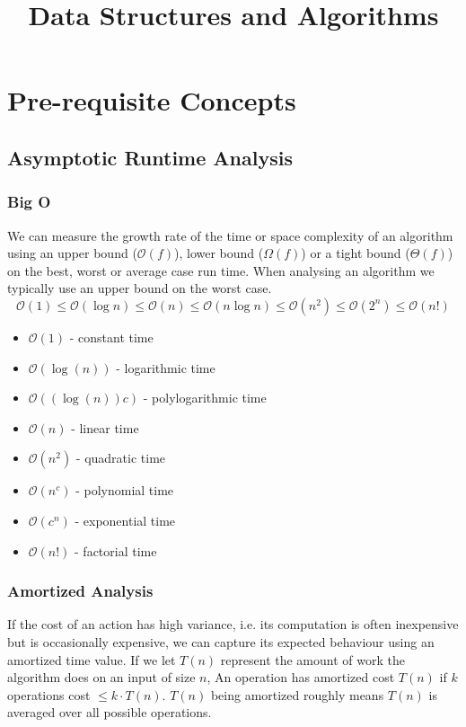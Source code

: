 \documentclass{article}
\title{\vspace{-3cm} Data Structures and Algorithms}
\author{}
\date{}
\newcommand{\bigO}{\mathcal{O}}
\begin{document}
\maketitle
\vspace{-1.5cm}
\tableofcontents
\newpage

\section{Pre-requisite Concepts}

    \subsection{Asymptotic Runtime Analysis}
    \subsubsection{Big O}
    We can measure the growth rate of the time or space complexity of an algorithm using an upper bound ($\bigO(f)$), lower bound ($\Omega (f) $) or a tight bound ($\Theta (f)$) on the best, worst or average case run time. When analysing an algorithm we typically use an upper bound on the worst case. 
    \[
        \bigO(1) \leq \bigO(\log n) \leq \bigO(n) \leq \bigO(n \log n) \leq \bigO(n^2) \leq  \bigO(2^n)  \leq \bigO(n!)
    \]
    \begin{multicols}{2}
    \begin{itemize}
        \item[] $\bigO(1)$ - constant time
        \item[] $\bigO(\log(n))$ - logarithmic time
        \item[] $\bigO((\log(n))c)$ - polylogarithmic time
        \item[] $\bigO(n)$ - linear time
        \item[] $\bigO(n^2)$ - quadratic time
        \item[] $\bigO(n^c)$ - polynomial time
        \item[] $\bigO(c^n)$ - exponential time
        \item[] $\bigO(n!)$ - factorial time
    \end{itemize}
    \end{multicols}
    
    \subsubsection{Amortized Analysis}
    If the cost of an action has high variance, i.e. its computation is often inexpensive but is occasionally expensive, we can capture its expected behaviour using an amortized time value. If we let $T(n)$ represent the amount of work the algorithm does on an input of size $n$, An operation has amortized cost $T(n)$ if $k$ operations cost $\leq k \cdot T(n)$. $T(n)$ being amortized roughly means $T(n)$ is averaged over all possible operations. 
    
\end{document}
